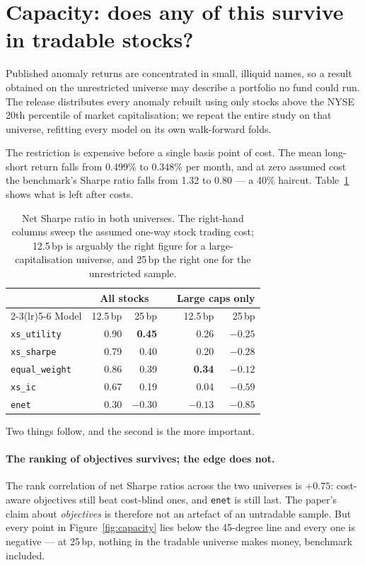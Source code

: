 \documentclass[11pt,a4paper]{article}
\begin{document}
\section{Capacity: does any of this survive in tradable stocks?}

Published anomaly returns are concentrated in small, illiquid names, so a result
obtained on the unrestricted universe may describe a portfolio no fund could run.
The release distributes every anomaly rebuilt using only stocks above the NYSE
20th percentile of market capitalisation; we repeat the entire study on that
universe, refitting every model on its own walk-forward folds.

The restriction is expensive before a single basis point of cost. The mean
long-short return falls from 0.499\% to 0.348\% per month, and at zero assumed
cost the benchmark's Sharpe ratio falls from 1.32 to 0.80 --- a 40\% haircut.
Table~\ref{tab:capacity} shows what is left after costs.

\begin{table}[t]
\centering\small
\caption{Net Sharpe ratio in both universes. The right-hand columns sweep the
assumed one-way stock trading cost; 12.5\,bp is arguably the right figure for a
large-capitalisation universe, and 25\,bp the right one for the unrestricted
sample.}
\label{tab:capacity}
\begin{tabular}{lrrrrr}
\toprule
& \multicolumn{2}{c}{All stocks} & & \multicolumn{2}{c}{Large caps only} \\
\cmidrule(lr){2-3}\cmidrule(lr){5-6}
Model & 12.5\,bp & 25\,bp & & 12.5\,bp & 25\,bp \\
\midrule
\texttt{xs\_utility}   & 0.90 & \textbf{0.45} & & 0.26 & $-0.25$ \\
\texttt{xs\_sharpe}    & 0.79 & 0.40 & & 0.20 & $-0.28$ \\
\rowcolor{black!7}
\texttt{equal\_weight} & 0.86 & 0.39 & & \textbf{0.34} & $-0.12$ \\
\texttt{xs\_ic}        & 0.67 & 0.19 & & 0.04 & $-0.59$ \\
\texttt{enet}          & 0.30 & $-0.30$ & & $-0.13$ & $-0.85$ \\
\bottomrule
\end{tabular}
\end{table}

Two things follow, and the second is the more important.

\paragraph{The ranking of objectives survives; the edge does not.} The rank
correlation of net Sharpe ratios across the two universes is $+0.75$: cost-aware
objectives still beat cost-blind ones, and \texttt{enet} is still last. The
paper's claim about \emph{objectives} is therefore not an artefact of an
untradable sample. But every point in Figure~\ref{fig:capacity} lies below the
45-degree line and every one is negative --- at 25\,bp, nothing in the tradable
universe makes money, benchmark included.
\end{document}
